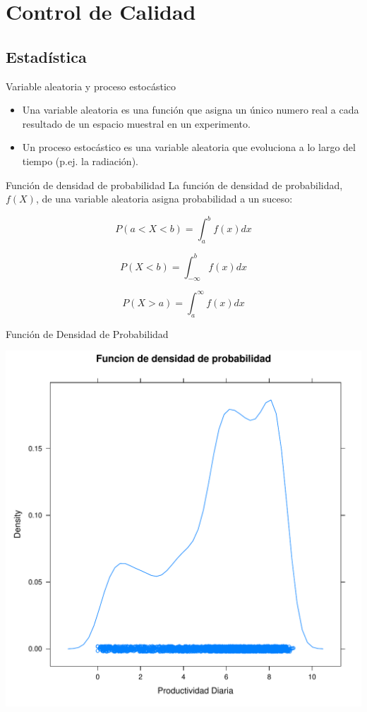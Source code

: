 \documentclass[xcolor={usenames,svgnames,dvipsnames}]{beamer}
\begin{document}
\section{Control de Calidad}
\label{sec:org7945958}

\subsection{Estadística}
\label{sec:orgeb02f6f}


\begin{frame}[label={sec:orgd986e50}]{Variable aleatoria y proceso estocástico}
\begin{itemize}
\item Una \alert{variable aleatoria} es una función que asigna un único numero
real a cada resultado de un espacio muestral en un experimento.
\item Un \alert{proceso estocástico} es una variable aleatoria que evoluciona a
lo largo del \alert{tiempo} (p.ej. la radiación).
\end{itemize}
\end{frame}


\begin{frame}[label={sec:orgc853df1}]{Función de densidad de probabilidad}
La función de densidad de probabilidad, \(f(X)\), de una variable
aleatoria \alert{asigna probabilidad} a un suceso:


\[
P(a<X<b)=\int_{a}^{b}f(x)dx
\]


\[
P(X<b)=\int_{-\infty}^{b}f(x)dx\]


\[
P(X>a)=\int_{a}^{\infty}f(x)dx\]
\end{frame}


\begin{frame}[label={sec:org0d9d28d}]{Función de Densidad de Probabilidad}
\begin{center}
\includegraphics[width=.9\linewidth]{../figs/FuncionDensidadProbabilidad.pdf}
\end{center}
\end{frame}
\end{document}
